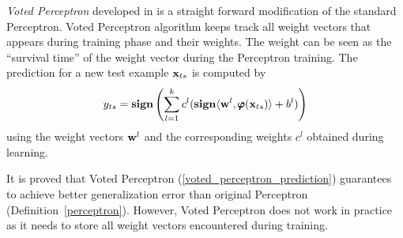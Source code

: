 {\textit{Voted Perceptron} developed in \citep{Freund99large} is a straight forward modification of the standard Perceptron.
Voted Perceptron algorithm keeps track all weight vectors that appears during training phase and their weights.
The weight can be seen as the ``survival time'' of the weight vector during the Perceptron training.
The prediction for a new test example $\vx_{ts}$ is computed by 
\begin{align}
	y_{ts} = \sign\left({\sum_{l=1}^{k}c^l(\sign{\ip{\vw^l}{\varphib(\vx_{ts})}+b^{l}}})\right) \label{voted_perceptron_prediction}
\end{align}
using the weight vectors $\mathbf {w}^l$ and the corresponding weights $c^l$ obtained during learning.
\iffalse
\textit{Voted Perceptron} developed in \citep{Freund99large} is a straight forward modification of the standard perceptron.
As described in (Algorithm~\ref{voted_perceptron}), the voted perceptron algorithm keeps track all weight vectors that appears during training phase (line~\ref{perceptron_algorithm_weight_vector}) and their weights (line~\ref{perceptron_algorithm_weight}).
The weight can be seen as the ``survival time'' of the weight vector during Perceptron training.
The prediction for a new test example $\vx_{ts}$ is computed by 
\begin{align}
	y_{ts} = \sign\left({\sum_{l=1}^{k}c^l(\sign{\ip{\vw^l}{\varphib(\vx_{ts})}+b^{l}}})\right) \label{voted_perceptron_prediction}
\end{align}
using the weight vectors and the corresponding weights output from the algorithm (line~\ref{perceptron_algorithm_average}).
\begin{algorithm}
\caption{Voted Perceptron Learning Algorithm}
\label{voted_perceptron}
\begin{algorithmic}[1]
	\REQUIRE Training sample $\lbrace (x_i,\vy_i)\rbrace_{i=1}^m$, iteration limit $T$
	\ENSURE Weight parameter $\vw$
	\STATE $\vw^{1}=\vzero,c^1=0$
	\STATE $k=1$
	\FOR{$t=1\cdots T$}
		\FOR{$i=1\cdots m$}
			\STATE Compute $\hat{y} = \sign(\ip{\vw}{\varphib(\vx_i)})$
			\IF{$\hat{y} = y_i$}
				\STATE $c^k = c^k + 1$
			\ELSE
				\STATE $\vw^{k+1} = \vw^{k} + \rho y_i\varphib(\vx_i)$ \label{perceptron_algorithm_weight_vector}
				\STATE $c^{k+1} =1$ \label{perceptron_algorithm_weight}
				\STATE $k=k+1$
			\ENDIF
		\ENDFOR
	\ENDFOR
	\RETURN $\vw = \{\vw^{k}\}_{l=1}^{k},\,c = \{c^{k}\}_{l=1}^{k}$ \label{perceptron_algorithm_average}
\end{algorithmic}
\end{algorithm}
\fi
It is proved that Voted Perceptron (\ref{voted_perceptron_prediction}) guarantees to achieve better generalization error than original Perceptron (Definition~\ref{perceptron}).
However, Voted Perceptron does not work in practice as it needs to store all weight vectors encountered during training.

}
